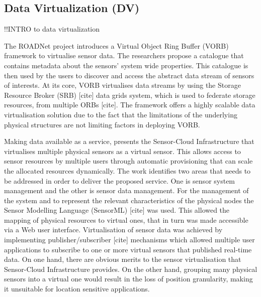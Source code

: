 \subsection{Data Virtualization (DV)}
!!INTRO to data virtualization

The ROADNet \cite{Rajasekar:2005:ASD:1080885.1080892} project introduces a Virtual Object Ring Buffer (VORB) framework  to virtualise sensor data. The researchers propose a catalogue that contains metadata about the sensors' system wide properties. This catalogue is then used by the users to discover and access the abstract data stream of sensors of interests. At its core, VORB virtualises data streams by using the Storage Resource Broker (SRB) [cite] data grids system, which is used to federate storage resources, from multiple ORBs [cite]. The framework offers a highly scalable data virtualisation solution due to the fact that the limitations of the underlying physical structures are not limiting factors in deploying VORB. 

Making data available as a service, \cite{yuriyama2010sensor} presents the Sensor-Cloud Infrastructure that virtualises multiple physical sensors as a virtual sensor. This allows access to sensor resources by multiple users through automatic provisioning that can scale the allocated resources dynamically. The work identifies two areas that needs to be addressed in order to deliver the proposed service. One is sensor system management and the other is sensor data management. For the management of the system and to represent the relevant characteristics of the physical nodes the Sensor Modelling Language (SensorML) [cite] was used. This allowed the mapping of physical resources to virtual ones, that in turn was made accessible via a Web user interface. Virtualisation of sensor data was achieved by implementing publisher/subscriber [cite] mechanisms which allowed multiple user applications to subscribe to one or more virtual sensors that published real-time data. On one hand, there are obvious merits to the sensor virtualisation that Sensor-Cloud Infrastructure provides. On the other hand, grouping many physical sensors into a virtual one would result in the loss of position granularity, making it unsuitable for location sensitive applications. 





